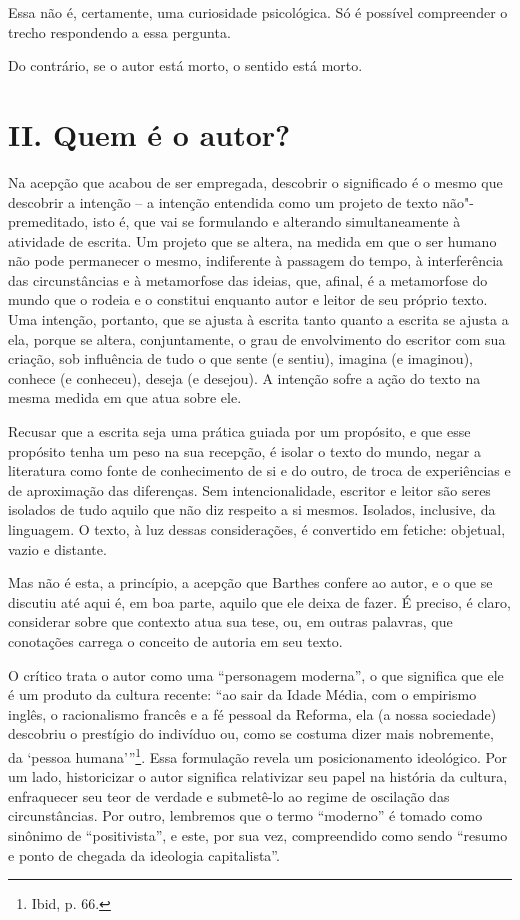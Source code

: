 Essa não é, certamente, uma curiosidade psicológica. Só é possível
compreender o trecho respondendo a essa pergunta.

Do contrário, se o autor está morto, o sentido está morto.

\section*{II. Quem é o autor?}

Na acepção que acabou de ser empregada, descobrir o significado é o
mesmo que descobrir a intenção -- a intenção entendida como um projeto
de texto não"-premeditado, isto é, que vai se formulando e alterando
simultaneamente à atividade de escrita. Um projeto que se altera, na
medida em que o ser humano não pode permanecer o mesmo, indiferente à
passagem do tempo, à interferência das circunstâncias e à metamorfose
das ideias, que, afinal, é a metamorfose do mundo que o rodeia e o
constitui enquanto autor e leitor de seu próprio texto. Uma intenção,
portanto, que se ajusta à escrita tanto quanto a escrita se ajusta a
ela, porque se altera, conjuntamente, o grau de envolvimento do escritor
com sua criação, sob influência de tudo o que sente (e sentiu), imagina
(e imaginou), conhece (e conheceu), deseja (e desejou). A intenção sofre
a ação do texto na mesma medida em que atua sobre ele.

Recusar que a escrita seja uma prática guiada por um propósito, e que
esse propósito tenha um peso na sua recepção, é isolar o texto do mundo,
negar a literatura como fonte de conhecimento de si e do outro, de troca
de experiências e de aproximação das diferenças. Sem intencionalidade,
escritor e leitor são seres isolados de tudo aquilo que não diz respeito
a si mesmos. Isolados, inclusive, da linguagem. O texto, à luz dessas
considerações, é convertido em fetiche: objetual, vazio e distante.

Mas não é esta, a princípio, a acepção que Barthes confere ao autor, e o
que se discutiu até aqui é, em boa parte, aquilo que ele deixa de fazer.
É preciso, é claro, considerar sobre que contexto atua sua tese, ou, em
outras palavras, que conotações carrega o conceito de autoria em seu
texto.

O crítico trata o autor como uma ``personagem moderna'', o que significa
que ele é um produto da cultura recente: ``ao sair da Idade Média, com o
empirismo inglês, o racionalismo francês e a fé pessoal da Reforma, ela
(a nossa sociedade) descobriu o prestígio do indivíduo ou, como se
costuma dizer mais nobremente, da `pessoa humana'''\footnote{Ibid, p.
  66.}. Essa formulação revela um posicionamento ideológico. Por um
lado, historicizar o autor significa relativizar seu papel na história
da cultura, enfraquecer seu teor de verdade e submetê-lo ao regime de
oscilação das circunstâncias. Por outro, lembremos que o termo
``moderno'' é tomado como sinônimo de ``positivista'', e este, por sua
vez, compreendido como sendo ``resumo e ponto de chegada da ideologia
capitalista''.

